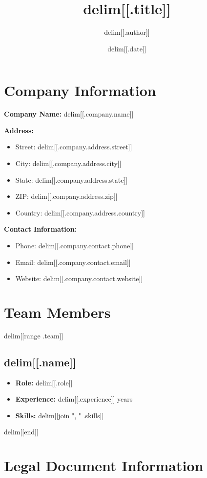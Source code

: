 \documentclass[12pt,a4paper]{article}
\title{delim[[.title]]}
\author{delim[[.author]]}
\date{delim[[.date]]}
\begin{document}
\maketitle

\section{Company Information}

\textbf{Company Name:} delim[[.company.name]]

\textbf{Address:}
\begin{itemize}
    \item Street: delim[[.company.address.street]]
    \item City: delim[[.company.address.city]]
    \item State: delim[[.company.address.state]]
    \item ZIP: delim[[.company.address.zip]]
    \item Country: delim[[.company.address.country]]
\end{itemize}

\textbf{Contact Information:}
\begin{itemize}
    \item Phone: delim[[.company.contact.phone]]
    \item Email: delim[[.company.contact.email]]
    \item Website: delim[[.company.contact.website]]
\end{itemize}

\section{Team Members}

delim[[range .team]]
\subsection{delim[[.name]]}
\begin{itemize}
    \item \textbf{Role:} delim[[.role]]
    \item \textbf{Experience:} delim[[.experience]] years
    \item \textbf{Skills:} delim[[join ", " .skills]]
\end{itemize}
delim[[end]]

\section{Legal Document Information}
\end{document}
